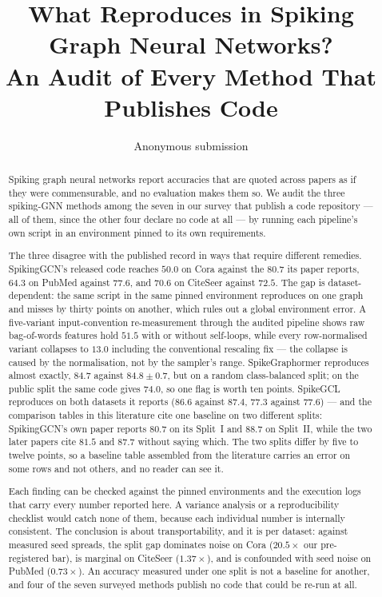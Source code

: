\documentclass[10pt,twocolumn]{article}
\title{\vspace{-1.2em}\bfseries What Reproduces in Spiking Graph Neural Networks?\\
An Audit of Every Method That Publishes Code}
\author{Anonymous submission}
\date{}
\begin{document}
\maketitle
\vspace{-1.5em}

\begin{abstract}
Spiking graph neural networks report accuracies that are quoted across papers as if they were
commensurable, and no evaluation makes them so. We audit the three spiking-GNN methods among the
seven in our survey that publish a code repository --- all of them, since the other four declare no
code at all --- by running each pipeline's own script in an environment pinned to its own
requirements.

The three disagree with the published record in ways that require different remedies. SpikingGCN's
released code reaches $50.0$ on Cora against the $80.7$ its paper reports, $64.3$ on PubMed against $77.6$,
and $70.6$ on CiteSeer against $72.5$. The gap is dataset-dependent: the same script in the same
pinned environment reproduces on one graph and misses by thirty points on another, which rules out a
global environment error. A five-variant input-convention re-measurement through the audited
pipeline shows raw bag-of-words features hold $51.5$ with or without self-loops, while every
row-normalised variant collapses to $13.0$ including the conventional rescaling fix --- the
collapse is caused by the normalisation, not by the sampler's range.
SpikeGraphormer reproduces almost exactly, $84.7$ against $84.8 \pm 0.7$, but on a random
class-balanced split; on the public split the same code gives $74.0$, so one flag is worth ten
points. SpikeGCL reproduces on both datasets it reports ($86.6$ against $87.4$, $77.3$ against
$77.6$) --- and the comparison tables in this literature cite one baseline on two different splits:
SpikingGCN's own paper reports $80.7$ on its Split~I and $88.7$ on Split~II, while
the two later papers cite $81.5$ and $87.7$ without saying which. The two splits differ by five to
twelve points, so a baseline table assembled from the literature carries an error on some rows and
not others, and no reader can see it.

Each finding can be checked against the pinned environments and the execution logs that carry every
number reported here. A variance analysis or a reproducibility checklist would catch none of them,
because each individual number is internally consistent. The conclusion is about transportability,
and it is per dataset: against measured seed spreads, the split gap dominates noise on Cora
($20.5\times$ our pre-registered bar), is marginal on CiteSeer ($1.37\times$), and is confounded
with seed noise on PubMed ($0.73\times$). An accuracy measured under one split is not a baseline
for another, and four of the seven surveyed methods publish no code that could be re-run at all.
\end{abstract}
\end{document}
